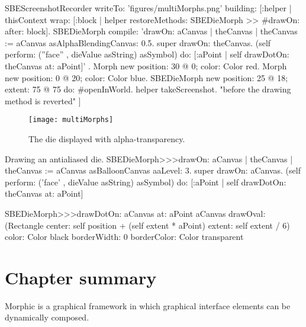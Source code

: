 \documentclass[a4paper,10pt,twoside]{book}
\begin{document}
\begin{ExecuteSmalltalkScript}
SBEScreenshotRecorder writeTo: 'figures/multiMorphs.png' building: [:helper |
	thisContext wrap: [:block | helper restoreMethods: {SBEDieMorph >> #drawOn:} after: block].
	SBEDieMorph compile: 'drawOn: aCanvas
	| theCanvas |
	theCanvas := aCanvas asAlphaBlendingCanvas: 0.5.
	super drawOn: theCanvas.
	(self perform: (''face'' , dieValue asString) asSymbol)
		do: [:aPoint | self drawDotOn: theCanvas at: aPoint]'
	.
	{ Morph new
		position: 30 @ 0;
		color: Color red.
	Morph new
		position: 0 @ 20;
		color: Color blue.
	SBEDieMorph new
		position: 25 @ 18;
		extent: 75 @ 75 } do: #openInWorld.
	helper takeScreenshot. "before the drawing method is reverted"
]
\end{ExecuteSmalltalkScript}
\begin{figure}[ht]
	\centerline{\texttt{[image: multiMorphs]}}
	\caption{The die displayed with alpha-transparency.
		\label{fig:multiMorphs}}
\end{figure}

\begin{methods}[aadie]{Drawing an antialiased die.}
SBEDieMorph>>>drawOn: aCanvas
	| theCanvas |
	theCanvas := aCanvas asBalloonCanvas aaLevel: 3.
	super drawOn: aCanvas.
	(self perform: ('face' , dieValue asString) asSymbol)
		do: [:aPoint | self drawDotOn: theCanvas at: aPoint]

SBEDieMorph>>>drawDotOn: aCanvas at: aPoint
	aCanvas
		drawOval: (Rectangle
			center: self position + (self extent * aPoint)
			extent: self extent / 6)
		color: Color black
		borderWidth: 0
		borderColor: Color transparent
\end{methods}

\section{Chapter summary}

Morphic is a graphical framework in which graphical interface elements can be dynamically composed.
\end{document}
